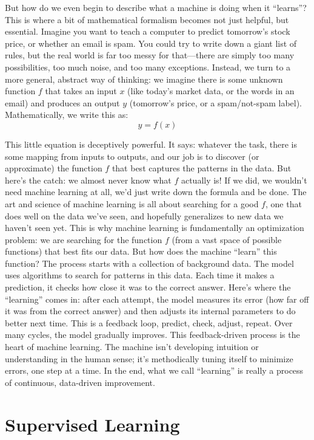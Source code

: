But how do we even begin to describe what a machine is doing when it ``learns''? This is where a bit of mathematical formalism becomes not just helpful, but essential. Imagine you want to teach a computer to predict tomorrow's stock price, or whether an email is spam. You could try to write down a giant list of rules, but the real world is far too messy for that---there are simply too many possibilities, too much noise, and too many exceptions. Instead, we turn to a more general, abstract way of thinking: we imagine there is some unknown function $f$ that takes an input $x$ (like today's market data, or the words in an email) and produces an output $y$ (tomorrow's price, or a spam/not-spam label). Mathematically, we write this as:
\[
y = f(x)
\]

This little equation is deceptively powerful. 
It says: whatever the task, there is some mapping from inputs to outputs, and our job is to discover (or approximate) the function $f$ that best captures the patterns in the data. 
But here's the catch: we almost never know what $f$ actually is! 
If we did, we wouldn't need machine learning at all, we'd just write down the formula and be done.
The art and science of machine learning is all about searching for a good $f$, one that does well on the data we've seen, and hopefully generalizes to new data we haven't seen yet. 
This is why machine learning is fundamentally an optimization problem: we are searching for the function $f$ (from a vast space of possible functions) that best fits our data.
But how does the machine ``learn'' this function? 
The process starts with a collection of background data. The model uses algorithms to search for patterns in this data.
Each time it makes a prediction, it checks how close it was to the correct answer. 
Here's where the ``learning'' comes in: after each attempt, the model measures its error (how far off it was from the correct answer) and then adjusts its internal parameters to do better next time.
This is a feedback loop, predict, check, adjust, repeat. Over many cycles, the model gradually improves.
This feedback-driven process is the heart of machine learning. 
The machine isn't developing intuition or understanding in the human sense; it's methodically tuning itself to minimize errors, one step at a time.
In the end, what we call ``learning'' is really a process of continuous, data-driven improvement.




\section{Supervised Learning}\label{sec:supervised}

